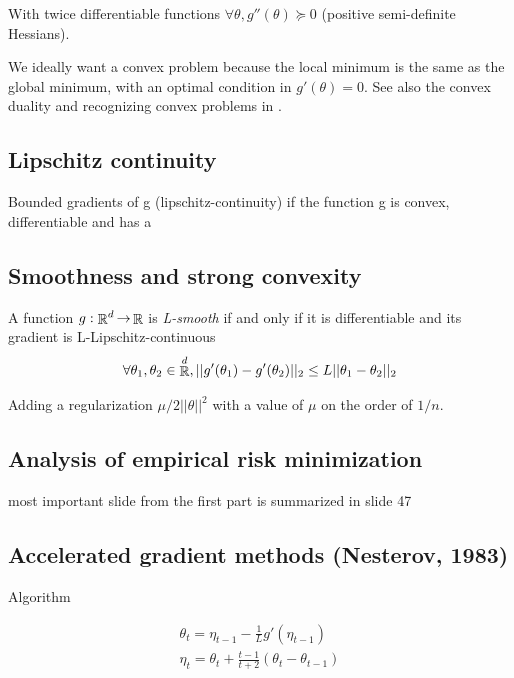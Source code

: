 \documentclass[b5paper]{report}
\begin{document}
With twice differentiable functions $\forall \theta, g''(\theta) \succeq 0$
(positive semi-definite Hessians).

We ideally want a convex problem because the local minimum is the same as the
global minimum, with an optimal condition in $g'(\theta) = 0$. See also the convex
duality and recognizing convex problems in \cite{boyd2004convex}.

\subsection{Lipschitz continuity}

Bounded gradients of g (lipschitz-continuity) if the function g is convex,
differentiable and has a

\subsection{Smoothness and strong convexity}

\begin{theorem}
  A function $g : \operatorname*{\mathbb{\mathop{R}}}^d \operatorname*{\rightarrow} \operatorname*{\mathbb{\mathop{R}}}$ is \emph{L-smooth} if and only if it is
  differentiable and its gradient is L-Lipschitz-continuous
  \begin{equation}
    \forall \theta_1, \theta_2 \in \operatorname*{\mathbb{\mathop{R}}}^d, ||g'(\theta_1) - g'(\theta_2) ||_2
    \le L||\theta_1 - \theta_2||_2
  \end{equation}
\end{theorem}

Adding a regularization $\mu/2 ||\theta||^2$ with a value of $\mu$ on the order
of $1/n$.

\subsection{Analysis of empirical risk minimization}

most important slide from the first part is summarized in slide 47


\subsection{Accelerated gradient methods (Nesterov, 1983)}

Algorithm

\begin{align}
  \theta_t = \eta_{t-1} - \frac{1}{L}g'(\eta_{t-1}) \\
  \eta_t = \theta_t + \frac{t-1}{t+2}(\theta_t - \theta_{t-1})
\end{align}
\end{document}
